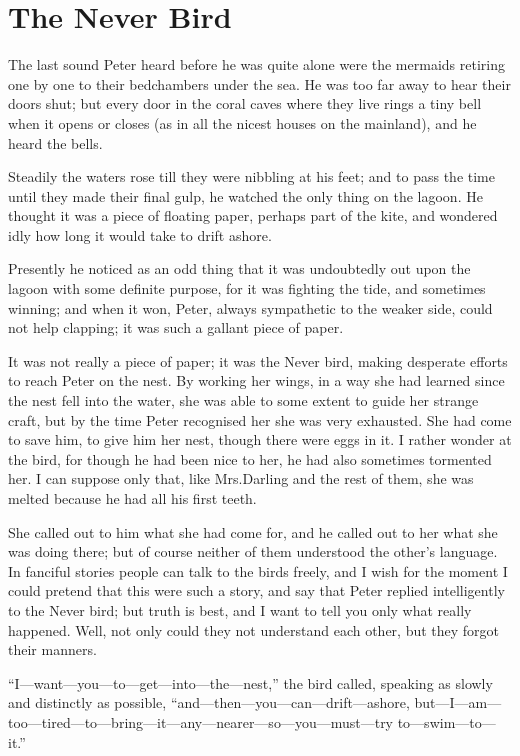 
\chapter{The Never Bird}

The last sound Peter heard before he was quite alone
were the mermaids retiring one by one to their bedchambers under the sea.
He was too far away to hear their doors shut;
but every door in the coral caves where they live rings a tiny bell when it opens or closes
(as in all the nicest houses on the mainland),
and he heard the bells.

Steadily the waters rose till they were nibbling at his feet;
and to pass the time until they made their final gulp,
he watched the only thing on the lagoon.
He thought it was a piece of floating paper, perhaps part of the kite,
and wondered idly how long it would take to drift ashore.

Presently he noticed as an odd thing that it was undoubtedly out upon the lagoon with some definite purpose,
for it was fighting the tide, and sometimes winning;
and when it won, Peter, always sympathetic to the weaker side, could not help clapping;
it was such a gallant piece of paper.

It was not really a piece of paper;
it was the Never bird, making desperate efforts to reach Peter on the nest.
By working her wings, in a way she had learned since the nest fell into the water,
she was able to some extent to guide her strange craft,
but by the time Peter recognised her she was very exhausted.
She had come to save him, to give him her nest, though there were eggs in it.
I rather wonder at the bird, for though he had been nice to her, he had also sometimes tormented her.
I can suppose only that, like Mrs.\@ Darling and the rest of them, she was melted because he had all his first teeth.

She called out to him what she had come for,
and he called out to her what she was doing there;
but of course neither of them understood the other’s language.
In fanciful stories people can talk to the birds freely,
and I wish for the moment I could pretend that this were such a story,
and say that Peter replied intelligently to the Never bird;
but truth is best, and I want to tell you only what really happened.
Well, not only could they not understand each other, but they forgot their manners.

“I—want—you—to—get—into—the—nest,” the bird called, speaking as slowly and distinctly as possible,
“and—then—you—can—drift—ashore,
but—I—am—too—tired—to—bring—it—any—nearer—so—you—must—try to—swim—to—it.”


